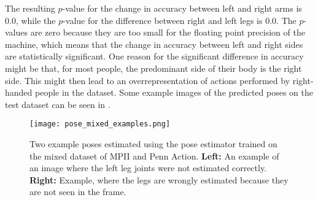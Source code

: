 The resulting $p$-value for the change in accuracy between left and right arms is $0.0$, while the $p$-value for the difference between right and left legs is $0.0$.
The $p$-values are zero because they are too small for the floating point precision of the machine, which means that the change in accuracy between left and right sides are statistically significant.  
One reason for the significant difference in accuracy might be that, for most people, the predominant side of their body is the right side.
This might then lead to an overrepresentation of actions performed by right-handed people in the dataset.
Some example images of the predicted poses on the test dataset can be seen in .

\begin{figure}[htb!]
    \centering
    \texttt{[image: pose\_mixed\_examples.png]}
    \caption{Two example poses estimated using the pose estimator trained on the mixed dataset of MPII and Penn Action. \textbf{Left:} An example of an image where the left leg joints were not estimated correctly. \textbf{Right:} Example, where the legs are wrongly estimated because they are not seen in the frame.}
    \label{fig:pose_mixed_examples}
\end{figure}


\begin{table}[]
    \small
    \centering
    \caption{Per joint accuracy, computed on the Penn Action test set using PCK @ 0.1 meassure. In addition, aggregated accuracy values are given in the third row for different sets of joints. \textit{Arms} for both left and right are computed by taking the average of the shoulder, elbow and wrist accuracies. \textit{Legs} are computed the same way, using knee, ankle and hip accuracy values. For \textit{Upper body}, the upper neck is added to \textit{Arms (both)}.}
    \label{tab:pose-mixed-perjoint}
\end{table}

